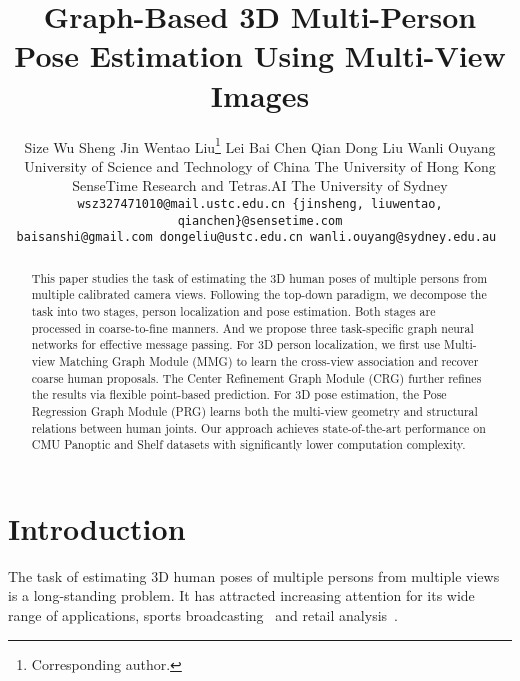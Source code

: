 \documentclass[10pt,twocolumn,letterpaper]{article}
\begin{document}
\title{Graph-Based 3D Multi-Person Pose Estimation Using Multi-View Images}

\author{Size Wu \quad Sheng Jin \quad Wentao Liu\thanks{Corresponding author.} \quad Lei Bai \quad Chen Qian \quad Dong Liu \quad Wanli Ouyang  \\
 University of Science and Technology of China \quad
 The University of Hong Kong \\  SenseTime Research and Tetras.AI \quad  The University of Sydney \\
\tt\small wsz327471010@mail.ustc.edu.cn  \quad \{jinsheng, liuwentao, qianchen\}@sensetime.com \\ 
\tt\small baisanshi@gmail.com \quad dongeliu@ustc.edu.cn   \quad wanli.ouyang@sydney.edu.au 
}



\maketitle
\ificcvfinal\thispagestyle{empty}\fi


\begin{abstract}
   This paper studies the task of estimating the 3D human poses of multiple persons from multiple calibrated camera views. Following the top-down paradigm, we decompose the task into two stages, \ie person localization and pose estimation. Both stages are processed in coarse-to-fine manners. And we propose three task-specific graph neural networks for effective message passing. For 3D person localization, we first use Multi-view Matching Graph Module (MMG) to learn the cross-view association and recover coarse human proposals. The Center Refinement Graph Module (CRG) further refines the results via flexible point-based prediction. For 3D pose estimation, the Pose Regression Graph Module (PRG) learns both the multi-view geometry and structural relations between human joints. Our approach achieves state-of-the-art performance on CMU Panoptic and Shelf datasets with significantly lower computation complexity.
\end{abstract}

\section{Introduction}
The task of estimating 3D human poses of multiple persons from multiple views is a long-standing problem. It has attracted increasing attention for its wide range of applications, \eg sports broadcasting~\cite{bridgeman2019multi} and retail analysis~\cite{tu2020voxelpose}. 
\end{document}
